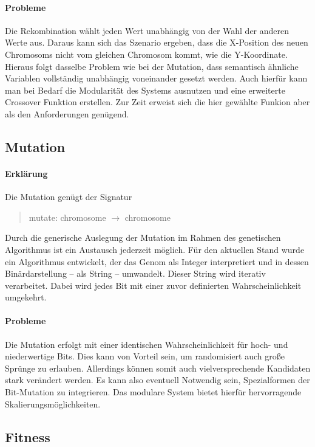 \documentclass[12pt,a4paper]{scrartcl}
\begin{document}
\paragraph{Probleme} Die Rekombination wählt jeden Wert unabhängig von der Wahl der anderen Werte aus. Daraus kann sich das Szenario ergeben, dass die X-Position des neuen Chromosoms nicht vom gleichen Chromosom kommt, wie die Y-Koordinate. Hieraus folgt dasselbe Problem wie bei der Mutation, dass semantisch ähnliche Variablen vollständig unabhängig voneinander gesetzt werden. Auch hierfür kann man bei Bedarf die Modularität des Systems ausnutzen und eine erweiterte Crossover Funktion erstellen. Zur Zeit erweist sich die hier gewählte Funkion aber als den Anforderungen genügend.

\subsection{Mutation}
\paragraph{Erklärung}
Die Mutation genügt der Signatur
\begin{quote}
 \textsf{mutate: chromosome $\rightarrow$ chromosome}
\end{quote}
Durch die generische Auslegung der Mutation im Rahmen des genetischen Algorithmus ist ein Austausch jederzeit möglich. Für den aktuellen Stand wurde ein Algorithmus entwickelt, der das Genom als Integer interpretiert und in dessen Binärdarstellung -- als String -- umwandelt. Dieser String wird iterativ verarbeitet. Dabei wird jedes Bit mit einer zuvor definierten Wahrscheinlichkeit umgekehrt.
\paragraph{Probleme} Die Mutation erfolgt mit einer identischen Wahrscheinlichkeit für hoch- und niederwertige Bits. Dies kann von Vorteil sein, um randomisiert auch große Sprünge zu erlauben. Allerdings können somit auch vielversprechende Kandidaten stark verändert werden. Es kann also eventuell Notwendig sein, Spezialformen der Bit-Mutation zu integrieren. Das modulare System bietet hierfür hervorragende Skalierungsmöglichkeiten.

\subsection{Fitness}
\end{document}
